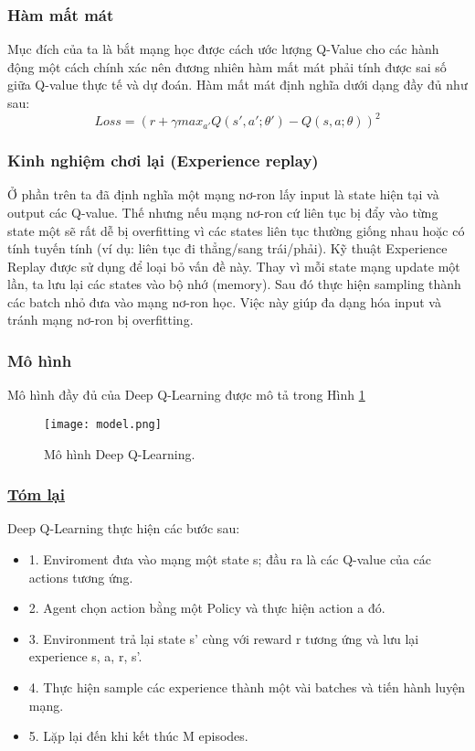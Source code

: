 \subsubsection{Hàm mất mát}
Mục đích của ta là bắt mạng học được cách ước lượng Q-Value cho các hành động một cách chính xác nên đương nhiên 
hàm mất mát phải tính được sai số giữa Q-value thực tế và dự đoán. Hàm mất mát định nghĩa dưới dạng đầy đủ 
như sau:
\begin{equation}
    \label{eq:lossf}
    Loss = (r + \gamma max_{a'}Q(s', a'; \theta') - Q(s, a; \theta))^2
\end{equation}
\subsubsection{Kinh nghiệm chơi lại (Experience replay)} 
Ở phần trên ta đã định nghĩa một mạng nơ-ron lấy input là state hiện tại và output các Q-value. 
Thế nhưng nếu mạng nơ-ron  cứ liên tục bị đẩy vào từng state một sẽ rất dễ bị overfitting 
vì các states liên tục thường giống nhau hoặc có tính tuyến tính (ví dụ: liên tục 
đi thẳng/sang trái/phải). Kỹ thuật Experience Replay được sử dụng để loại bỏ vấn đề này.
 Thay vì mỗi state mạng update một lần, ta lưu lại các states vào bộ nhớ (memory).
 Sau đó thực hiện sampling thành các batch nhỏ đưa vào mạng nơ-ron học. Việc này giúp đa 
 dạng hóa input và tránh mạng nơ-ron bị overfitting.
 \subsubsection{Mô hình}
 Mô hình đầy đủ của Deep Q-Learning được mô tả trong Hình \ref{fig:deepqlearning}
 \begin{figure}[ht]
    \centering
    \texttt{[image: model.png]}
    \caption{Mô hình Deep Q-Learning.}
    \label{fig:deepqlearning}
\end{figure}
\subsubsection{\underline{Tóm lại}}
Deep Q-Learning thực hiện các bước sau:
\begin{itemize}
    \item 1. Enviroment đưa vào mạng một state s; đầu ra là các Q-value của các actions tương ứng.
    \item 2. Agent chọn action bằng một Policy và thực hiện action a đó.
    \item 3. Environment trả lại state s' cùng với reward r tương ứng và lưu lại experience s, a, r, s'.
    \item 4. Thực hiện sample các experience thành một vài batches và tiến hành luyện mạng.
    \item 5. Lặp lại đến khi kết thúc M episodes.
\end{itemize}